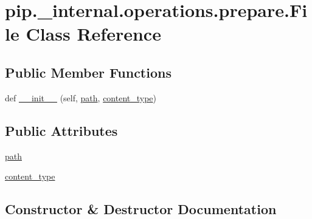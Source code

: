 \hypertarget{classpip_1_1__internal_1_1operations_1_1prepare_1_1File}{}\section{pip.\+\_\+internal.\+operations.\+prepare.\+File Class Reference}
\label{classpip_1_1__internal_1_1operations_1_1prepare_1_1File}
\subsection*{Public Member Functions}
\begin{DoxyCompactItemize}
\item 
def \hyperlink{classpip_1_1__internal_1_1operations_1_1prepare_1_1File_ad7625613a8ff3b6bc8b282c3adf3b9ea}{\+\_\+\+\_\+init\+\_\+\+\_\+} (self, \hyperlink{classpip_1_1__internal_1_1operations_1_1prepare_1_1File_a8e3ef36b8fcd022c5018372b04f83a62}{path}, \hyperlink{classpip_1_1__internal_1_1operations_1_1prepare_1_1File_ad0be17a06935eec6fe6d288783b30f3a}{content\+\_\+type})
\end{DoxyCompactItemize}
\subsection*{Public Attributes}
\begin{DoxyCompactItemize}
\item 
\hyperlink{classpip_1_1__internal_1_1operations_1_1prepare_1_1File_a8e3ef36b8fcd022c5018372b04f83a62}{path}
\item 
\hyperlink{classpip_1_1__internal_1_1operations_1_1prepare_1_1File_ad0be17a06935eec6fe6d288783b30f3a}{content\+\_\+type}
\end{DoxyCompactItemize}


\subsection{Constructor \& Destructor Documentation}
\mbox{\label{classpip_1_1__internal_1_1operations_1_1prepare_1_1File_ad7625613a8ff3b6bc8b282c3adf3b9ea}} 
